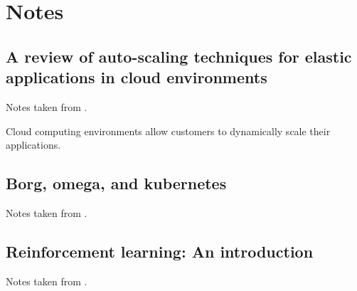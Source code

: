 \chapter{Notes}
\label{chp:notes}

\section{A review of auto-scaling techniques for elastic applications in cloud environments}
\label{sec:lorido2014review}

Notes taken from \cite{lorido2014review}.

Cloud computing environments allow customers to dynamically scale their applications.


\section{Borg, omega, and kubernetes}
\label{sec:burns2016borg}

Notes taken from \cite{burns2016borg}.


\section{Reinforcement learning: An introduction}
\label{sec:sutton1998reinforcement}

Notes taken from \cite{sutton1998reinforcement}.
